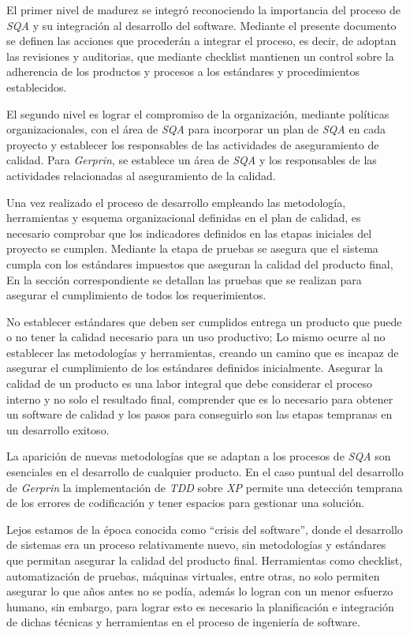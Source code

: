 El primer nivel de madurez se integró reconociendo la importancia del proceso de \emph{SQA} y su integración al desarrollo del software. Mediante el presente documento se definen las acciones que procederán a integrar el proceso, es decir, de adoptan las revisiones y auditorias, que mediante checklist mantienen un control sobre la adherencia de los productos y procesos a los estándares y procedimientos establecidos.

El segundo nivel es lograr el compromiso de la organización, mediante políticas organizacionales, con el área de \emph{SQA} para incorporar un plan de \emph{SQA} en cada proyecto y establecer los responsables de las actividades de aseguramiento de calidad. Para \emph{Gerprin}, se establece un área de \emph{SQA} y los responsables de las actividades relacionadas al aseguramiento de la calidad. 

Una vez realizado el proceso de desarrollo empleando las metodología, herramientas y esquema organizacional definidas en el plan de calidad, es necesario comprobar que los indicadores definidos en las etapas iniciales del proyecto se cumplen. Mediante la etapa de pruebas se asegura que el sistema cumpla con los estándares impuestos que aseguran la calidad del producto final, En la sección correspondiente se detallan las pruebas que se realizan para asegurar el cumplimiento de todos los requerimientos. 

No establecer estándares que deben ser cumplidos entrega un producto que puede o no tener la calidad necesario para un uso productivo; Lo mismo ocurre al no establecer las metodologías y herramientas, creando un camino que es incapaz de asegurar el cumplimiento de los estándares definidos inicialmente. Asegurar la calidad de un producto es una labor integral que debe considerar el proceso interno y no solo el resultado final, comprender que es lo necesario para obtener un software de calidad y los pasos para conseguirlo son las etapas tempranas en un desarrollo exitoso. 

La aparición de nuevas metodologías que se adaptan a los procesos de \emph{SQA} son esenciales en el desarrollo de cualquier producto. En el caso puntual del desarrollo de \emph{Gerprin} la implementación de \emph{TDD} sobre \emph{XP} permite una detección temprana de los errores de codificación y tener espacios para gestionar una solución. 

Lejos estamos de la época conocida como “crisis del software”, donde el desarrollo de sistemas era un proceso relativamente nuevo, sin metodologías y estándares que permitan asegurar la calidad del producto final. Herramientas como checklist, automatización de pruebas, máquinas virtuales, entre otras, no solo permiten asegurar lo que años antes no se podía, además lo logran con un menor esfuerzo humano, sin embargo, para lograr esto es necesario la planificación e integración de dichas técnicas y herramientas en el proceso de ingeniería de software. 
